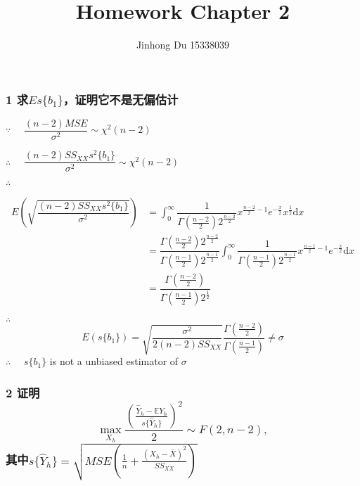 \documentclass[]{article}
\title{Homework Chapter 2}
\author{Jinhong Du 15338039}
\date{}
\begin{document}
\maketitle

\subsubsection{\texorpdfstring{1
求\(Es\{b_1\}\)，证明它不是无偏估计}{1 求Es\textbackslash{}\{b\_1\textbackslash{}\}，证明它不是无偏估计}}\label{esb_1}

\(\because\quad\) \(\dfrac{(n-2)MSE}{\sigma^2}\sim\chi^2(n-2)\)

\(\therefore\quad\)
\(\dfrac{(n-2)SS_{XX}s^2\{b_1\}}{\sigma^2}\sim\chi^2(n-2)\)

\(\therefore\quad\)

\begin{align*}
E\left(\sqrt{\dfrac{(n-2)SS_{XX}s^2\{b_1\}}{\sigma^2}}\right)&=\int_0^{\infty}\dfrac{1}{\Gamma(\frac{n-2}{2})2^{\frac{n-2}{2}}}x^{\frac{n-2}{2}-1}e^{-\frac{x}{2}} x^{\frac{1}{2}}\mathrm{d}x\\
&=\dfrac{\Gamma(\frac{n-2}{2})2^{\frac{n-2}{2}}}{\Gamma(\frac{n-1}{2})2^{\frac{n-1}{2}}}\int_0^{\infty}\dfrac{1}{\Gamma(\frac{n-1}{2})2^{\frac{n-1}{2}}}x^{\frac{n-1}{2}-1}e^{-\frac{x}{2}} \mathrm{d}x\\
&=\dfrac{\Gamma(\frac{n-2}{2})}{\Gamma(\frac{n-1}{2})2^{\frac{1}{2}}}
\end{align*}

\(\therefore\quad\)
\[E(s\{b_1\})=\sqrt{\dfrac{\sigma^2}{2(n-2)SS_{XX}}}\dfrac{\Gamma(\frac{n-2}{2})}{\Gamma(\frac{n-1}{2})}\neq \sigma\]
\(\therefore\quad\) \(s\{b_1\}\) is not a unbiased estimator of
\(\sigma\)

\subsubsection{\texorpdfstring{2
证明\[\max\limits_{X_h}\frac{\left(\frac{\hat{Y}_h-\mathbb{E}Y_h}{s\{\hat{Y}_h\}}\right)^2}{2}\sim F(2,n-2),\]其中\(s\{\hat{Y}_h\}=\sqrt{MSE\left(\frac{1}{n}+\frac{(X_h-\overline{X})^2}{SS_{XX}}\right)}\)}{2 证明\textbackslash{}max\textbackslash{}limits\_\{X\_h\}\textbackslash{}frac\{\textbackslash{}left(\textbackslash{}frac\{\textbackslash{}hat\{Y\}\_h-\textbackslash{}mathbb\{E\}Y\_h\}\{s\textbackslash{}\{\textbackslash{}hat\{Y\}\_h\textbackslash{}\}\}\textbackslash{}right)\^{}2\}\{2\}\textbackslash{}sim F(2,n-2),其中s\textbackslash{}\{\textbackslash{}hat\{Y\}\_h\textbackslash{}\}=\textbackslash{}sqrt\{MSE\textbackslash{}left(\textbackslash{}frac\{1\}\{n\}+\textbackslash{}frac\{(X\_h-\textbackslash{}overline\{X\})\^{}2\}\{SS\_\{XX\}\}\textbackslash{}right)\}}}\label{maxlimits_x_hfracleftfrachaty_h-mathbbey_hshaty_hright22sim-f2n-2shaty_hsqrtmseleftfrac1nfracx_h-overlinex2ss_xxright}
\end{document}

